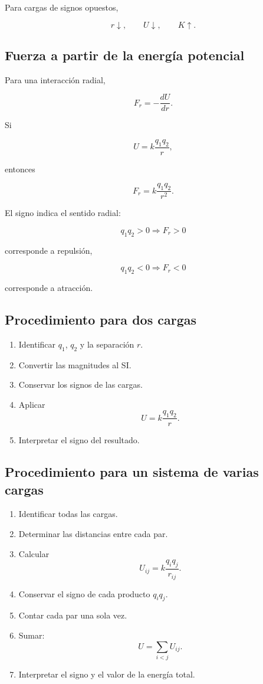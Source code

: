 Para cargas de signos opuestos,

\[
\boxed{
r\downarrow,\qquad U\downarrow,\qquad K\uparrow
}.
\]


\subsection{Fuerza a partir de la energía potencial}

Para una interacción radial,

\[
\boxed{
F_r=-\frac{dU}{dr}
}.
\]

Si

\[
U=k\frac{q_1q_2}{r},
\]

entonces

\[
\boxed{
F_r=k\frac{q_1q_2}{r^2}
}.
\]

El signo indica el sentido radial:

\[
q_1q_2>0
\Longrightarrow
F_r>0
\]

corresponde a repulsión,

\[
q_1q_2<0
\Longrightarrow
F_r<0
\]

corresponde a atracción.


\subsection{Procedimiento para dos cargas}

\begin{enumerate}
    \item Identificar \(q_1\), \(q_2\) y la separación \(r\).
    \item Convertir las magnitudes al SI.
    \item Conservar los signos de las cargas.
    \item Aplicar
    \[
    U=k\frac{q_1q_2}{r}.
    \]
    \item Interpretar el signo del resultado.
\end{enumerate}


\subsection{Procedimiento para un sistema de varias cargas}

\begin{enumerate}
    \item Identificar todas las cargas.
    \item Determinar las distancias entre cada par.
    \item Calcular
    \[
    U_{ij}=k\frac{q_iq_j}{r_{ij}}.
    \]
    \item Conservar el signo de cada producto \(q_iq_j\).
    \item Contar cada par una sola vez.
    \item Sumar:
    \[
    U=\sum_{i<j}U_{ij}.
    \]
    \item Interpretar el signo y el valor de la energía total.
\end{enumerate}



